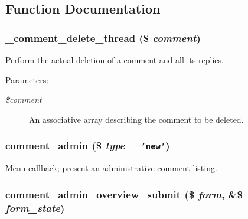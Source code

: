 \subsection{Function Documentation}
\hypertarget{comment_8admin_8inc_01cb7ccc4e6978fadf981c8610b00c12}{
\subsubsection[{\_\-comment\_\-delete\_\-thread}]{\setlength{\rightskip}{0pt plus 5cm}\_\-comment\_\-delete\_\-thread (\$ {\em comment})}}
\label{comment_8admin_8inc_01cb7ccc4e6978fadf981c8610b00c12}


Perform the actual deletion of a comment and all its replies.

\begin{Desc}
\item[Parameters:]
\begin{description}
\item[{\em \$comment}]An associative array describing the comment to be deleted. \end{description}
\end{Desc}
\hypertarget{comment_8admin_8inc_fe7a967aebd51b588b647caada9b506a}{
\subsubsection[{comment\_\-admin}]{\setlength{\rightskip}{0pt plus 5cm}comment\_\-admin (\$ {\em type} = {\tt 'new'})}}
\label{comment_8admin_8inc_fe7a967aebd51b588b647caada9b506a}


Menu callback; present an administrative comment listing. \hypertarget{comment_8admin_8inc_e242a86117c7b818ad449f42dd63706c}{
\subsubsection[{comment\_\-admin\_\-overview\_\-submit}]{\setlength{\rightskip}{0pt plus 5cm}comment\_\-admin\_\-overview\_\-submit (\$ {\em form}, \/  \&\$ {\em form\_\-state})}}
\label{comment_8admin_8inc_e242a86117c7b818ad449f42dd63706c}


